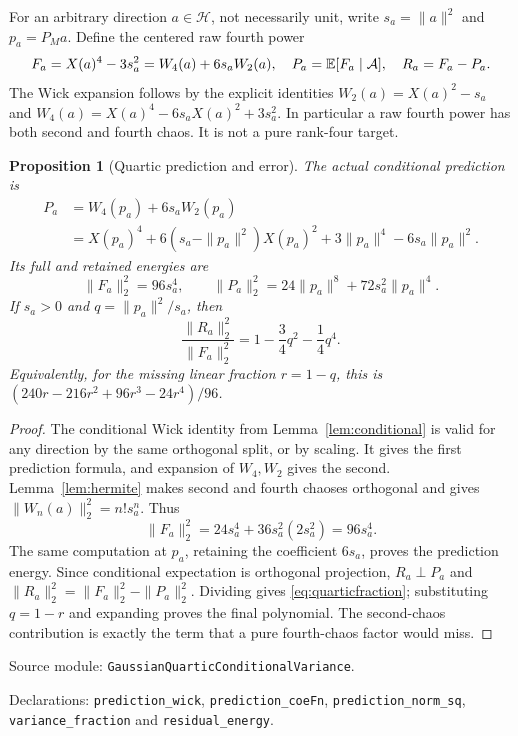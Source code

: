 \documentclass[11pt]{article}
\newtheorem{proposition}[theorem]{Proposition}
\newcommand{\Hh}{\mathcal H}\newcommand{\U}{\mathcal U}
\newcommand{\code}[1]{{\small\nolinkurl{#1}}}
\begin{document}
For an arbitrary direction $a\in\Hh$, not necessarily unit, write
$s_a=\|a\|^2$ and $p_a=P_Ma$. Define the centered raw fourth power
\[
 F_a=X(a)^4-3s_a^2=W_4(a)+6s_aW_2(a),
 \quad P_a=\mathbb E[F_a\mid\mathcal A],\quad R_a=F_a-P_a.
\]
The Wick expansion follows by the explicit identities
$W_2(a)=X(a)^2-s_a$ and
$W_4(a)=X(a)^4-6s_aX(a)^2+3s_a^2$.
In particular a raw fourth power has both second and fourth chaos.
It is not a pure rank-four target.

\begin{proposition}[Quartic prediction and error]\label{prop:quartic}
The actual conditional prediction is
\begin{align*}
 P_a&=W_4(p_a)+6s_aW_2(p_a)\\
 &=X(p_a)^4+6(s_a-\|p_a\|^2)X(p_a)^2
                   +3\|p_a\|^4-6s_a\|p_a\|^2.
\end{align*}
Its full and retained energies are
\[
 \|F_a\|_2^2=96s_a^4,\qquad
 \|P_a\|_2^2=24\|p_a\|^8+72s_a^2\|p_a\|^4.
\]
If $s_a>0$ and $q=\|p_a\|^2/s_a$, then
\begin{equation}\label{eq:quarticfraction}
 \frac{\|R_a\|_2^2}{\|F_a\|_2^2}
 =1-\frac34q^2-\frac14q^4.
\end{equation}
Equivalently, for the missing linear fraction $r=1-q$, this is
$(240r-216r^2+96r^3-24r^4)/96$.
\end{proposition}
\begin{proof}
The conditional Wick identity from Lemma~\ref{lem:conditional} is valid for
any direction by the same orthogonal split, or by scaling. It gives the
first prediction formula, and expansion of $W_4,W_2$ gives the second.
Lemma~\ref{lem:hermite} makes second and fourth chaoses orthogonal and gives
$\|W_n(a)\|_2^2=n!s_a^n$. Thus
\[
 \|F_a\|_2^2=24s_a^4+36s_a^2(2s_a^2)=96s_a^4.
\]
The same computation at $p_a$, retaining the coefficient $6s_a$, proves
the prediction energy. Since conditional expectation is orthogonal
projection, $R_a\perp P_a$ and
$\|R_a\|_2^2=\|F_a\|_2^2-\|P_a\|_2^2$. Dividing gives
\eqref{eq:quarticfraction}; substituting $q=1-r$ and expanding proves
the final polynomial. The second-chaos contribution is exactly the term
that a pure fourth-chaos factor would miss.
\end{proof}
Source module: \code{GaussianQuarticConditionalVariance}.
\par\noindent Declarations: \code{prediction_wick},
\code{prediction_coeFn}, \code{prediction_norm_sq},
\code{variance_fraction} and \code{residual_energy}.
\end{document}
